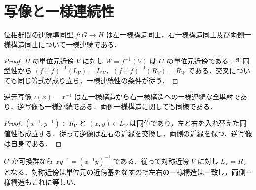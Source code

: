 \section{写像と一様連続性}
\begin{prop}[連続準同型の一様連続性]
位相群間の連続準同型 $f:G\to H$ は左一様構造同士，右一様構造同士及び両側一様構造同士について一様連続である．
\end{prop}
\begin{proof}
$H$ の単位元近傍 $V$ に対し $W=f^{-1}(V)$ は $G$ の単位元近傍である．準同型性から $(f\times f)^{-1}(L_V)=L_W$，$(f\times f)^{-1}(R_V)=R_W$ である．交叉についても同じ等式が成り立ち，一様連続性の条件が従う．
\end{proof}
\begin{prop}[逆元写像と左右一様構造]
逆元写像 $\iota(x)=x^{-1}$ は左一様構造から右一様構造への一様連続な全単射であり，逆写像も一様連続である．両側一様構造に関しても同様である．
\end{prop}
\begin{proof}
$(x^{-1},y^{-1})\in R_V$ と $(x,y)\in L_V$ は同値であり，左と右を入れ替えた同値性も成立する．従って逆像は左右の近縁を交換し，両側の近縁を保つ．逆写像は自身である．
\end{proof}
\begin{prop}[可換位相群の一様構造]
$G$ が可換群なら $xy^{-1}=(x^{-1}y)^{-1}$ である．従って対称近傍 $V$ に対し $L_V=R_V$ となる．対称近傍は単位元の近傍基をなすので左右の一様構造は一致し，両側一様構造もこれに等しい．
\end{prop}
